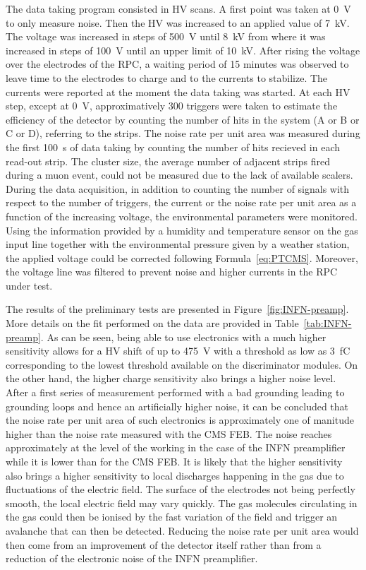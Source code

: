     The data taking program consisted in \acl{HV} scans. A first point was taken at \SI{0}{V} to only measure noise. Then the HV was increased to an applied value of \SI{7}{kV}. The voltage was increased in steps of \SI{500}{V} until \SI{8}{kV} from where it was increased in steps of \SI{100}{V} until an upper limit of \SI{10}{kV}. After rising the voltage over the electrodes of the RPC, a waiting period of 15 minutes was observed to leave time to the electrodes to charge and to the currents to stabilize. The currents were reported at the moment the data taking was started. At each HV step, except at \SI{0}{V}, approximatively 300 triggers were taken to estimate the efficiency of the detector by counting the number of hits in the system (A or B or C or D), referring to the strips. The noise rate per unit area was measured during the first \SI{100}{s} of data taking by counting the number of hits recieved in each read-out strip. The cluster size, the average number of adjacent strips fired during a muon event, could not be measured due to the lack of available scalers.\\
    During the data acquisition, in addition to counting the number of signals with respect to the number of triggers, the current or the noise rate per unit area as a function of the increasing voltage, the environmental parameters were monitored. Using the information provided by a humidity and temperature sensor on the gas input line together with the environmental pressure given by a weather station, the applied voltage could be corrected following Formula~\ref{eq:PTCMS}. Moreover, the voltage line was filtered to prevent noise and higher currents in the RPC under test.
    
    The results of the preliminary tests are presented in Figure~\ref{fig:INFN-preamp}. More details on the fit performed on the data are provided in Table~\ref{tab:INFN-preamp}. As can be seen, being able to use electronics with a much higher sensitivity allows for a HV shift of up to \SI{475}{V} with a threshold as low as \SI{3}{fC} corresponding to the lowest threshold available on the discriminator modules. On the other hand, the higher charge sensitivity also brings a higher noise level. After a first series of measurement performed with a bad grounding leading to grounding loops and hence an artificially higher noise, it can be concluded that the noise rate per unit area of such electronics is approximately one of manitude higher than the noise rate measured with the CMS FEB. The noise reaches approximately  at the level of the working in the case of the INFN preamplifier while it is lower than  for the CMS FEB. It is likely that the higher sensitivity also brings a higher sensitivity to local discharges happening in the gas due to fluctuations of the electric field. The surface of the electrodes not being perfectly smooth, the local electric field may vary quickly. The gas molecules circulating in the gas could then be ionised by the fast variation of the field and trigger an avalanche that can then be detected. Reducing the noise rate per unit area would then come from an improvement of the detector itself rather than from a reduction of the electronic noise of the INFN preamplifier.
	
